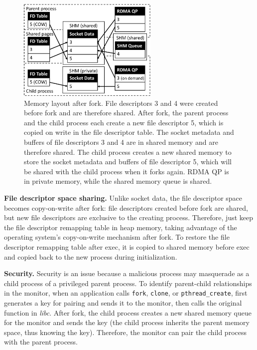 \begin{figure}[htbp]
	\centering
	\includegraphics[width=0.6\textwidth]{images/fork_memory}
	\caption{Memory layout after fork. File descriptors 3 and 4 were created before fork and are therefore shared. After fork, the parent process and the child process each create a new file descriptor 5, which is copied on write in the file descriptor table. The socket metadata and buffers of file descriptors 3 and 4 are in shared memory and are therefore shared. The child process creates a new shared memory to store the socket metadata and buffers of file descriptor 5, which will be shared with the child process when it forks again. RDMA QP is in private memory, while the shared memory queue is shared.}
	\label{socksdirect:fig:fork-memory}
\end{figure}

\textbf {File descriptor space sharing.}
Unlike socket data, the file descriptor space becomes copy-on-write after fork: file descriptors created before fork are shared, but new file descriptors are exclusive to the creating process. Therefore, just keep the file descriptor remapping table in heap memory, taking advantage of the operating system's copy-on-write mechanism after fork. To restore the file descriptor remapping table after exec, it is copied to shared memory before exec and copied back to the new process during \libipc {} initialization.

\textbf{Security.}
Security is an issue because a malicious process may masquerade as a child process of a privileged parent process. To identify parent-child relationships in the monitor, when an application calls \texttt {fork}, \texttt {clone}, or \texttt {pthread\_create}, \libipc {} first generates a key for pairing and sends it to the monitor, then calls the original function in \emph {libc}. After fork, the child process creates a new shared memory queue for the monitor and sends the key (the child process inherits the parent memory space, thus knowing the key). Therefore, the monitor can pair the child process with the parent process.


